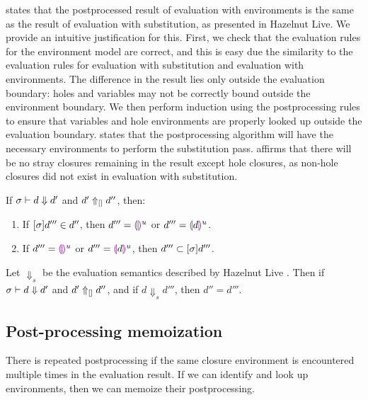  states that the postprocessed result of evaluation with environments is the same as the result of evaluation with substitution, as presented in Hazelnut Live. We provide an intuitive justification for this. First, we check that the evaluation rules for the environment model are correct, and this is easy due the similarity to the evaluation rules for evaluation with substitution and evaluation with environments. The difference in the result lies only outside the evaluation boundary: holes and variables may not be correctly bound outside the environment boundary. We then perform induction using the postprocessing rules to ensure that variables and hole environments are properly looked up outside the evaluation boundary.  states that the postprocessing algorithm will have the necessary environments to perform the substitution pass.  affirms that there will be no stray closures remaining in the result except hole closures, as non-hole closures did not exist in evaluation with substitution.

\begin{theorem}
  If $\sigma\vdash d\Downarrow d'$ and $d'\Uparrow_{[]} d''$, then:
  \begin{enumerate}
  \item If $[\sigma]d'''\in d''$, then $d'''=\textcolor{violet}{\llparenthesis}\textcolor{violet}{\rrparenthesis}^u$ or $d'''=\textcolor{violet}{\llparenthesis} d\textcolor{violet}{\rrparenthesis}^u$.
  \item If $d'''=\textcolor{violet}{\llparenthesis}\textcolor{violet}{\rrparenthesis}^u$ or $d'''=\textcolor{violet}{\llparenthesis} d\textcolor{violet}{\rrparenthesis}^u$, then $d'''\subset[\sigma]d'''$.
  \end{enumerate}
  \label{thm:substitution-postprocessing}
\end{theorem}

\begin{theorem}
  Let $\Downarrow_s$ be the evaluation semantics described by Hazelnut Live \cite{conf/popl/HazelnutLive19}. Then if $\sigma\vdash d\Downarrow d'$ and $d'\Uparrow_{[]} d''$, and if $d\Downarrow_s d'''$, then $d''=d'''$.
  \label{thm:eval-correctness}
\end{theorem}

\subsection{Post-processing memoization}
\label{sec:memoization}

There is repeated postprocessing if the same closure environment is encountered multiple times in the evaluation result. If we can identify and look up environments, then we can memoize their postprocessing.

